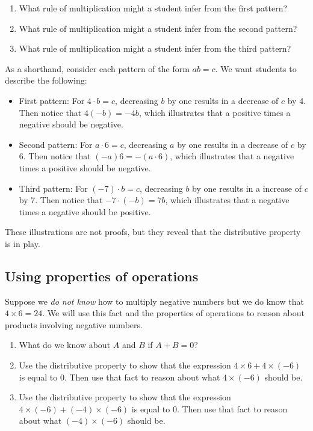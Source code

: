 \begin{prob}
\begin{enumerate}
\item What rule of multiplication might a student infer from the first pattern? 
\item What rule of multiplication might a student infer from the second pattern?
\item What rule of multiplication might a student infer from the third pattern?
\end{enumerate}
\begin{teachingnote}
As a shorthand, consider each pattern of the form $ab = c$.  We want students to describe the following:  
\begin{itemize}
\item First pattern:  For $4\cdot b = c$, decreasing $b$ by one results in a decrease of $c$ by 4.  Then notice that $4(-b) = -4b$, which illustrates that a positive times a negative should be negative. 
\item Second pattern:  For $a\cdot 6= c$, decreasing $a$ by one results in a decrease of $c$ by 6.  Then notice that $(-a)6 = -(a\cdot 6)$, which illustrates that a negative times a positive should be negative.  
\item Third pattern:  For $(-7)\cdot b= c$, decreasing $b$ by one results in a increase of $c$ by 7.  Then notice that $-7\cdot (-b) = 7b $, which illustrates that a negative times a negative should be positive. 
\end{itemize}
These illustrations are not proofs, but they reveal that the distributive property is in play.  
\end{teachingnote}
\end{prob}

\subsection*{Using properties of operations}

\begin{prob}
Suppose we \emph{do not know} how to multiply negative numbers but we do know that $4\times 6=24$. We will use this fact and the properties of operations to reason about products involving negative numbers.  
\begin{enumerate}
\item What do we know about $A$ and $B$ if $A+B=0$?  
\item Use the distributive property to show that the expression $4\times 6 + 4\times(-6)$ is equal to $0$.  
Then use that fact to reason about what $4\times(-6)$ should be.  
\item Use the distributive property to show that the expression $4\times (-6) + (-4)\times (-6)$ is equal to $0$.  
Then use that fact to reason about what $(-4)\times(-6)$ should be.  
\end{enumerate}
\end{prob}

